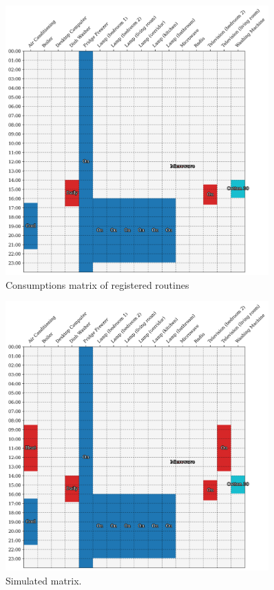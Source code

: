 \begin{figure}
    \centering
    \includegraphics[width=0.9\textwidth]{images/real_matrix.png}
    \caption{Consumptions matrix of registered routines}
    \label{fig:existing_consumption_matrix}
\end{figure}

\begin{figure}
    \centering
    \includegraphics[width=0.9\textwidth]{images/simulated_matrix.png}
    \caption{Simulated matrix.}
    \label{fig:simulated_consumption_matrix}
\end{figure}
